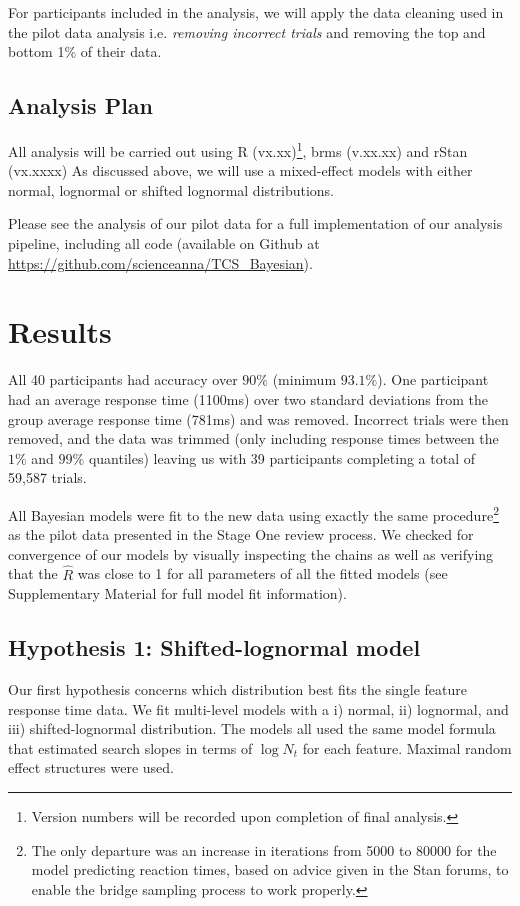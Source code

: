 \documentclass[preprint,12pt,authoryear]{elsarticle}
\begin{document}
For participants included in the analysis, we will apply the data cleaning used in the pilot data analysis i.e. \textit{removing incorrect trials} and removing the top and bottom 1\% of their data.

\subsection{Analysis Plan}

All analysis will be carried out using R (vx.xx)\footnote{Version numbers will be recorded upon completion of final analysis.}, brms (v.xx.xx) and rStan (vx.xxxx) As discussed above, we will use a mixed-effect models with either normal, lognormal or shifted lognormal distributions. 

Please see the analysis of our pilot data for a full implementation of our analysis pipeline, including all code (available on Github at  
\url{https://github.com/scienceanna/TCS_Bayesian}).


\section{Results}

All 40 participants had accuracy over $90\%$ (minimum $93.1\%$). One participant had an average response time (1100ms) over two standard deviations from the group average response time (781ms) and was removed. Incorrect trials were then removed, and the data was trimmed (only including response times between the $1\%$ and $99\%$ quantiles) leaving us with 39 participants completing a total of 59,587 trials.

All Bayesian models were fit to the new data using exactly the same procedure\footnote{The only departure was an increase in iterations from 5000 to 80000 for the model predicting reaction times, based on advice given in the Stan forums, to enable the bridge sampling process to work properly.} as the pilot data presented in the Stage One review process. We checked for convergence  of our models by visually inspecting the chains as well as verifying that the $\hat{R}$ was close to 1 for all parameters of all the fitted models (see Supplementary Material for full model fit information).

\subsection{Hypothesis 1: Shifted-lognormal model}

Our first hypothesis concerns which distribution best fits the single feature response time data. We fit multi-level models with
a i) normal, ii) lognormal, and iii) shifted-lognormal distribution. The models all used the same model formula that estimated search slopes in terms of $\log{N_t}$ for each feature. Maximal random effect structures were used. 
\end{document}
